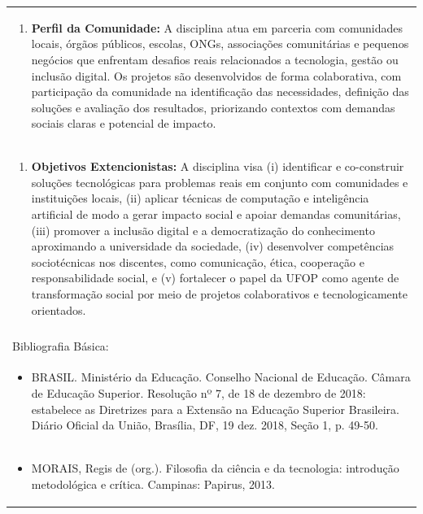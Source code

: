 \documentclass[11pt]{article}
\begin{document}
\begin{center}
\begin{longtable}{|p{4cm}|p{4cm}|p{4cm}|p{4cm}|}
\multicolumn{4}{|p{\dimexpr 16cm + 6\tabcolsep\relax}|}{\begin{enumerate}[start=11]\item \textbf{Perfil da Comunidade:} A disciplina atua em parceria com comunidades locais, órgãos públicos, escolas, ONGs, associações comunitárias e pequenos negócios que enfrentam desafios reais relacionados a tecnologia, gestão ou inclusão digital. Os projetos são desenvolvidos de forma colaborativa, com participação da comunidade na identificação das necessidades, definição das soluções e avaliação dos resultados, priorizando contextos com demandas sociais claras e potencial de impacto.\end{enumerate}}\\
\multicolumn{4}{|p{\dimexpr 16cm + 6\tabcolsep\relax}|}{\begin{enumerate}[start=12]\item \textbf{Objetivos Extencionistas:} A disciplina visa (i) identificar e co-construir soluções tecnológicas para problemas reais em conjunto com comunidades e instituições locais, (ii) aplicar técnicas de computação e inteligência artificial de modo a gerar impacto social e apoiar demandas comunitárias, (iii) promover a inclusão digital e a democratização do conhecimento aproximando a universidade da sociedade, (iv) desenvolver competências sociotécnicas nos discentes, como comunicação, ética, cooperação e responsabilidade social, e (v) fortalecer o papel da UFOP como agente de transformação social por meio de projetos colaborativos e tecnologicamente orientados.\end{enumerate}}\\
\multicolumn{4}{|p{\dimexpr 16cm + 6\tabcolsep\relax}|}{}\\
\hline
\multicolumn{4}{|p{16cm}|}{Bibliografia Básica:}\\*
\multicolumn{4}{|p{\dimexpr 16cm + 6\tabcolsep\relax}|}{\begin{itemize}\item BRASIL. Ministério da Educação. Conselho Nacional de Educação. Câmara de Educação Superior. Resolução nº 7, de 18 de dezembro de 2018: estabelece as Diretrizes para a Extensão na Educação Superior Brasileira. Diário Oficial da União, Brasília, DF, 19 dez. 2018, Seção 1, p. 49-50.\end{itemize}}\\
\multicolumn{4}{|p{\dimexpr 16cm + 6\tabcolsep\relax}|}{\begin{itemize}\item MORAIS, Regis de (org.). Filosofia da ciência e da tecnologia: introdução metodológica e crítica. Campinas: Papirus, 2013.\end{itemize}}\\

\end{longtable}
\end{center}
\end{document}
